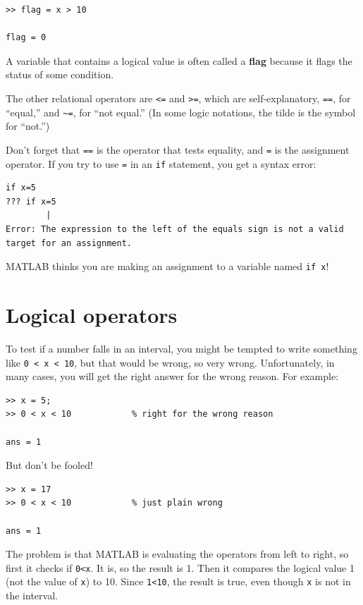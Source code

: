 \documentclass[
]{book}
\begin{document}
\begin{verbatim}
>> flag = x > 10

flag = 0
\end{verbatim}

A variable that contains a logical value is often called a {\bf flag}
because it flags the status of some condition.

The other relational operators are {\tt <=} and {\tt >=}, which are
self-explanatory, {\tt ==}, for ``equal,'' and
\verb+~=+, for ``not equal.''  (In some logic notations, the tilde
is the symbol for ``not.'')

Don't forget that {\tt ==} is the operator that tests equality,
and {\tt =} is the assignment operator.  If you try to use {\tt =} in
an {\tt if} statement, you get a syntax error:

\begin{verbatim}
if x=5
??? if x=5
        |
Error: The expression to the left of the equals sign is not a valid
target for an assignment.
\end{verbatim}

MATLAB thinks you are making an assignment to a variable named {\tt if x}!


\section{Logical operators}
\label{sect:logop}

To test if a number falls in an interval, you might be
tempted to write something like {\tt 0 < x < 10}, but that
would be wrong, so very wrong.  Unfortunately, in many cases,
you will get the right answer for the wrong reason.  For
example:

\begin{verbatim}
>> x = 5;
>> 0 < x < 10            % right for the wrong reason

ans = 1
\end{verbatim}

But don't be fooled!

\begin{verbatim}
>> x = 17
>> 0 < x < 10            % just plain wrong

ans = 1
\end{verbatim}

The problem is that MATLAB is evaluating the operators from left
to right, so first it checks if {\tt 0<x}.  It is, so the result
is 1.  Then it compares the logical value 1 (not the value of
{\tt x}) to 10.  Since {\tt 1<10}, the result is true, even though
{\tt x} is not in the interval.
\end{document}

